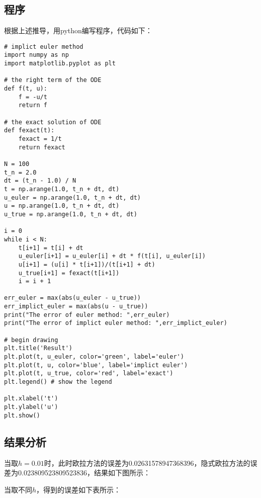 \documentclass{ctexart}
\begin{document}
\subsection{程序}
根据上述推导，用python编写程序，代码如下：
\begin{lstlisting}
# implict euler method
import numpy as np
import matplotlib.pyplot as plt

# the right term of the ODE
def f(t, u):
    f = -u/t
    return f

# the exact solution of ODE 
def fexact(t):
    fexact = 1/t
    return fexact

N = 100
t_n = 2.0
dt = (t_n - 1.0) / N
t = np.arange(1.0, t_n + dt, dt)
u_euler = np.arange(1.0, t_n + dt, dt)
u = np.arange(1.0, t_n + dt, dt)
u_true = np.arange(1.0, t_n + dt, dt)

i = 0
while i < N:
    t[i+1] = t[i] + dt
    u_euler[i+1] = u_euler[i] + dt * f(t[i], u_euler[i])
    u[i+1] = (u[i] * t[i+1])/(t[i+1] + dt)
    u_true[i+1] = fexact(t[i+1])
    i = i + 1

err_euler = max(abs(u_euler - u_true))
err_implict_euler = max(abs(u - u_true))
print("The error of euler method: ",err_euler)
print("The error of implict euler method: ",err_implict_euler)

# begin drawing
plt.title('Result')
plt.plot(t, u_euler, color='green', label='euler')
plt.plot(t, u, color='blue', label='implict euler')
plt.plot(t, u_true, color='red', label='exact')
plt.legend() # show the legend

plt.xlabel('t')
plt.ylabel('u')
plt.show()
\end{lstlisting}

\subsection{结果分析}
当取$h=0.01$时，此时欧拉方法的误差为0.02631578947368396，隐式欧拉方法的误差为0.023809523809523836，结果如下图所示：

当取不同$h$，得到的误差如下表所示：
\end{document}
